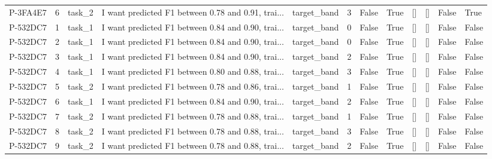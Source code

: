 \begin{tabular}{lrlllrllllll}
   P-3FA4E7 &        6 & task\_2 & I want predicted F1 between 0.78 and 0.91, trai... &   target\_band &          3 &          False &                  True &               [] &             [] &              False &             True \\
   P-532DC7 &        1 & task\_1 & I want predicted F1 between 0.84 and 0.90, trai... &   target\_band &          0 &          False &                  True &               [] &             [] &              False &            False \\
   P-532DC7 &        2 & task\_1 & I want predicted F1 between 0.84 and 0.90, trai... &   target\_band &          0 &          False &                  True &               [] &             [] &              False &            False \\
   P-532DC7 &        3 & task\_1 & I want predicted F1 between 0.84 and 0.90, trai... &   target\_band &          2 &          False &                  True &               [] &             [] &              False &            False \\
   P-532DC7 &        4 & task\_1 & I want predicted F1 between 0.80 and 0.88, trai... &   target\_band &          3 &          False &                  True &               [] &             [] &              False &            False \\
   P-532DC7 &        5 & task\_2 & I want predicted F1 between 0.78 and 0.86, trai... &   target\_band &          1 &          False &                  True &               [] &             [] &              False &            False \\
   P-532DC7 &        6 & task\_1 & I want predicted F1 between 0.84 and 0.90, trai... &   target\_band &          2 &          False &                  True &               [] &             [] &              False &            False \\
   P-532DC7 &        7 & task\_2 & I want predicted F1 between 0.78 and 0.88, trai... &   target\_band &          1 &          False &                  True &               [] &             [] &              False &            False \\
   P-532DC7 &        8 & task\_2 & I want predicted F1 between 0.78 and 0.88, trai... &   target\_band &          3 &          False &                  True &               [] &             [] &              False &            False \\
   P-532DC7 &        9 & task\_2 & I want predicted F1 between 0.78 and 0.88, trai... &   target\_band &          2 &          False &                  True &               [] &             [] &              False &            False \\

\end{tabular}
